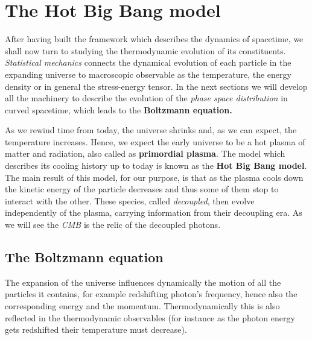 \chapter{The Hot Big Bang model}
After having built the framework which describes the dynamics of spacetime, we shall now turn to studying the thermodynamic evolution of its constituents. \emph{Statistical mechanics} connects the dynamical evolution of each particle in the expanding universe to macroscopic observable as the temperature, the energy density or in general the stress-energy tensor. In the next sections we will develop all the machinery to describe the evolution of the \emph{phase space distribution} in curved spacetime, which leads to the \textbf{Boltzmann equation.}

As we rewind time from today, the universe shrinks and, as we can expect, the temperature increases. Hence, we expect the early universe to be a hot plasma of matter and radiation, also called as \textbf{primordial plasma}. The model which describes its cooling history up to today is known as the \textbf{Hot Big Bang model}. The main result of this model, for our purpose, is that as the plasma cools down the kinetic energy of the particle decreases and thus some of them stop to interact with the other. These species, called \emph{decoupled}, then evolve independently of the plasma, carrying information from their decoupling era. As we will see the \emph{CMB} is the relic of the decoupled photons. 

\section{The Boltzmann equation}
The expansion of the universe influences dynamically the motion of all the particles it contains, for example redshifting photon's frequency, hence also the corresponding energy and the momentum. Thermodynamically this is also reflected in the thermodynamic observables (for instance as the photon energy gets redshifted their temperature must decrease). 

